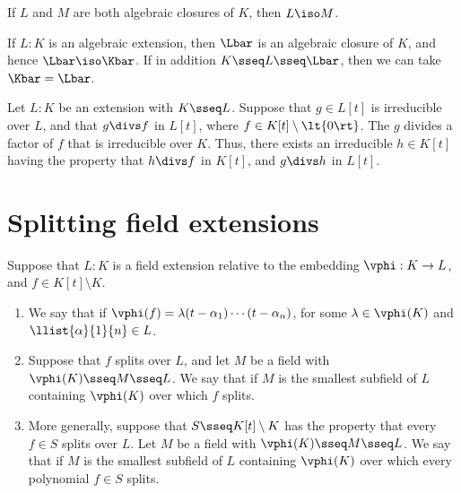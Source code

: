 \documentclass{article}
\begin{document}
  \begin{tproposition}
    If \( L \) and \( M \) are both algebraic closures of \( K \), then \( L \iso M \).
  \end{tproposition}

  \begin{tproposition}
    If \( L:K \) is an algebraic extension, then \( \Lbar \) is an algebraic closure of \( K \), and hence \( \Lbar\iso\Kbar \).
    If in addition \( K\sseq L\sseq \Lbar \), then we can take \( \Kbar = \Lbar \).
  \end{tproposition}

  \begin{tproposition}
    Let \( L:K \) be an extension with \( K\sseq L \).
    Suppose that \( g\in L[t] \) is irreducible over \( L \), and that \( g\divs f \) in \( L[t] \), where \( f\in K[t]\setminus \lt\{ 0 \rt\} \).
    The \( g \) divides a factor of \( f \) that is irreducible over \( K \).
    Thus, there exists an irreducible \( h\in K[t] \) having the property that \( h\divs f \) in \( K[t] \), and \( g\divs h \) in \( L[t] \).
  \end{tproposition}

\section{Splitting field extensions}
  \begin{tdefinition}
    Suppose that \( L:K \) is a field extension relative to the embedding \( \vphi : K\to L \), and \( f\in K[t]\setminus K \).
    \begin{enumerate}[label=(\roman*)]
      \item We say that  if \( \vphi(f)=\lambda(t-\alpha_1)\cdots(t-\alpha_n) \), for some \( \lambda\in \vphi(K) \) and \( \llist{\alpha}{1}{n}\in L \).
      \item Suppose that \( f \) splits over \( L \), and let \( M \) be a field with \( \vphi(K)\sseq M\sseq L \).
        We say that   if \( M \) is the smallest subfield of \( L \) containing \( \vphi(K) \) over which \( f \) splits.
      \item More generally, suppose that \( S\sseq K[t]\setminus K \) has the property that every \( f\in S \) splits over \( L \).
        Let \( M \) be a field with \( \vphi(K)\sseq M\sseq L \).
        We say that  if \( M \) is the smallest subfield of \( L \) containing \( \vphi(K) \) over which every polynomial \( f\in S \) splits.
    \end{enumerate}
  \end{tdefinition}
\end{document}
